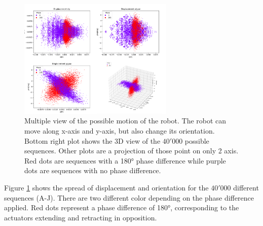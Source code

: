         \begin{figure}[h]
            \centering
            \includegraphics[width=0.66\textwidth]{images/displacement_spread.png}
            \caption{Multiple view of the possible motion of the robot. The robot can move along x-axis and y-axis, but also change its orientation. Bottom right plot shows the 3D view of the $40'000$ possible sequences. Other plots are a projection of those point on only 2 axis. Red dots are sequences with a 180° phase difference while purple dots are sequences with no phase difference.}
            \label{fig:displacement_spread}
        \end{figure}
        
        Figure \ref{fig:displacement_spread} shows the spread of displacement and orientation for the $40'000$ different sequences (A-J). There are two different color depending on the phase difference applied. Red dots represent a phase difference of 180°, corresponding to the actuators extending and retracting in opposition.
        
